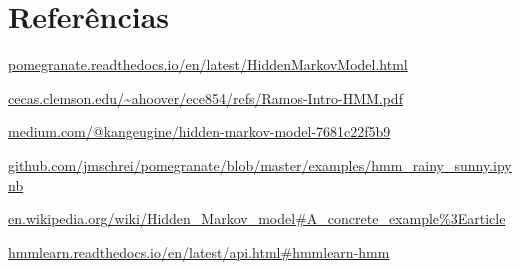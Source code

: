 \documentclass{article}
\begin{document}
\section{Referências}
\url{pomegranate.readthedocs.io/en/latest/HiddenMarkovModel.html}

\url{cecas.clemson.edu/~ahoover/ece854/refs/Ramos-Intro-HMM.pdf}

\url{medium.com/@kangeugine/hidden-markov-model-7681c22f5b9}

\url{github.com/jmschrei/pomegranate/blob/master/examples/hmm_rainy_sunny.ipynb}

\url{en.wikipedia.org/wiki/Hidden_Markov_model#A_concrete_example%3Earticle}

\url{hmmlearn.readthedocs.io/en/latest/api.html#hmmlearn-hmm}
\end{document}
